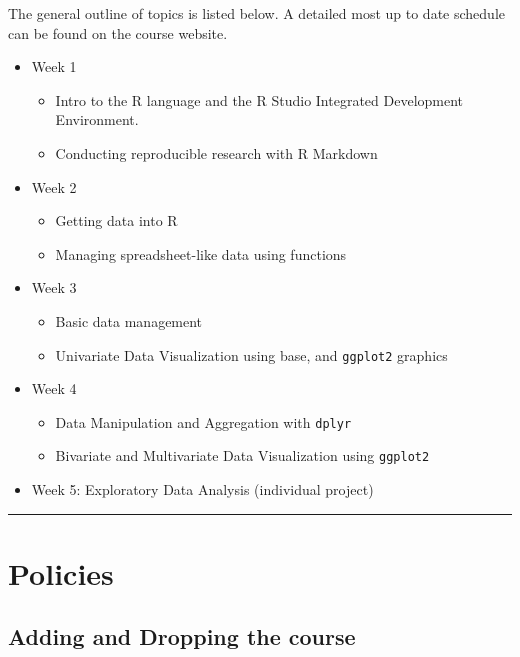\documentclass[11pt,]{article}
\providecommand{\tightlist}{%
  \setlength{\itemsep}{0pt}\setlength{\parskip}{0pt}}
\begin{document}
The general outline of topics is listed below. A detailed most up to
date schedule can be found on the course website.

\begin{itemize}
\tightlist
\item
  Week 1

  \begin{itemize}
  \tightlist
  \item
    Intro to the R language and the R Studio Integrated Development
    Environment.
  \item
    Conducting reproducible research with R Markdown
  \end{itemize}
\item
  Week 2

  \begin{itemize}
  \tightlist
  \item
    Getting data into R
  \item
    Managing spreadsheet-like data using functions
  \end{itemize}
\item
  Week 3

  \begin{itemize}
  \tightlist
  \item
    Basic data management
  \item
    Univariate Data Visualization using base, and \texttt{ggplot2}
    graphics
  \end{itemize}
\item
  Week 4

  \begin{itemize}
  \tightlist
  \item
    Data Manipulation and Aggregation with \texttt{dplyr}
  \item
    Bivariate and Multivariate Data Visualization using \texttt{ggplot2}
  \end{itemize}
\item
  Week 5: Exploratory Data Analysis (individual project)
\end{itemize}

\begin{center}\rule{0.5\linewidth}{\linethickness}\end{center}

\hypertarget{policies}{%
\section{Policies}\label{policies}}

\hypertarget{adding-and-dropping-the-course}{%
\subsection{Adding and Dropping the
course}\label{adding-and-dropping-the-course}}
\end{document}

